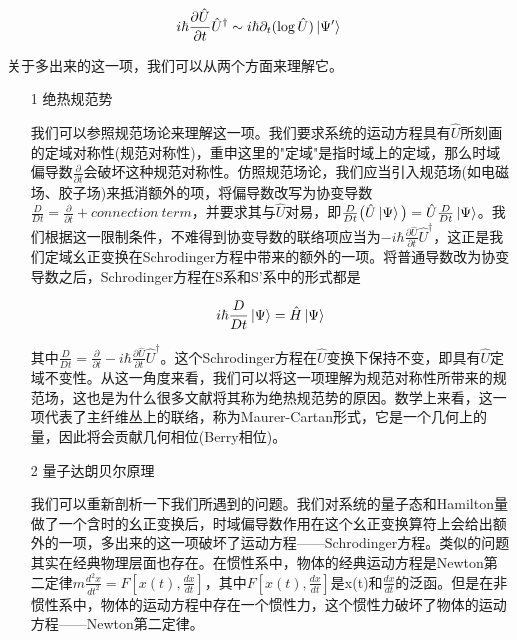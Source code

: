 \documentclass[a4paper]{article}
\begin{document}
        \begin{equation}
            i\hbar\frac{\partial\hat{U}}{\partial t}\hat{U}^\dagger\sim i\hbar\partial_t(\log\hat{U})\ket{\Psi'}
        \end{equation}

        关于多出来的这一项，我们可以从两个方面来理解它。

        \begin{itemize}
        \item[1] 绝热规范势 
            
            我们可以参照规范场论来理解这一项。我们要求系统的运动方程具有$\hat{U}$所刻画的定域对称性(规范对称性)，重申这里的"定域"是指时域上的定域，那么时域偏导数$\frac{\partial}{\partial t}$会破坏这种规范对称性。仿照规范场论，我们应当引入规范场(如电磁场、胶子场)来抵消额外的项，将偏导数改写为协变导数$\frac{D}{Dt}=\frac{\partial}{\partial t}+connection\ term$，并要求其与$\hat{U}$对易，即$\frac{D}{Dt}\big(\hat{U}\ket{\Psi}\big)=\hat{U}\frac{D}{Dt}\ket{\Psi}$。我们根据这一限制条件，不难得到协变导数的联络项应当为$-i\hbar\frac{\partial\hat{U}}{\partial t}\hat{U}^\dagger$，这正是我们定域幺正变换在Schrodinger方程中带来的额外的一项。将普通导数改为协变导数之后，Schrodinger方程在S系和S'系中的形式都是

            \begin{equation}
                i\hbar\frac{D}{Dt}\ket{\Psi} = \hat{H}\ket{\Psi}
            \end{equation}

            其中$\frac{D}{Dt}=\frac{\partial}{\partial t}-i\hbar\frac{\partial\hat{U}}{\partial t}\hat{U}^\dagger$。这个Schrodinger方程在$\hat{U}$变换下保持不变，即具有$\hat{U}$定域不变性。从这一角度来看，我们可以将这一项理解为规范对称性所带来的规范场，这也是为什么很多文献将其称为绝热规范势的原因。数学上来看，这一项代表了主纤维丛上的联络，称为Maurer-Cartan形式，它是一个几何上的量，因此将会贡献几何相位(Berry相位)。
        
        \item[2] 量子达朗贝尔原理
            
            我们可以重新剖析一下我们所遇到的问题。我们对系统的量子态和Hamilton量做了一个含时的幺正变换后，时域偏导数作用在这个幺正变换算符上会给出额外的一项，多出来的这一项破坏了运动方程——Schrodinger方程。类似的问题其实在经典物理层面也存在。在惯性系中，物体的经典运动方程是Newton第二定律$m\frac{d^2x}{dt^2}=F[x(t),\frac{dx}{dt}]$，其中$F[x(t),\frac{dx}{dt}]$是x(t)和$\frac{dx}{dt}$的泛函。但是在非惯性系中，物体的运动方程中存在一个惯性力，这个惯性力破坏了物体的运动方程——Newton第二定律。


\end{itemize}
\end{document}
